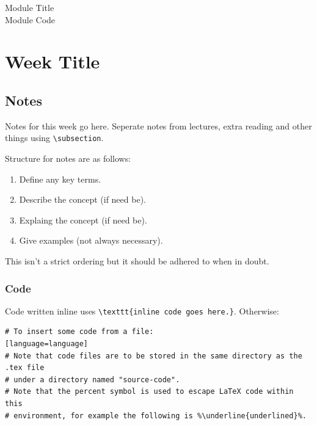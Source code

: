 \documentclass[a4paper,oneside]{report}
\begin{document}
\begin{titlepage}
	\raggedleft
	\vspace*{1cm}
	\Huge{Module Title}\\
	\vspace{0.5cm}
	\Large{Module Code}
\end{titlepage}

\null
\thispagestyle{empty}
\addtocounter{page}{-2}
\newpage

\tableofcontents

\chapter{Week Title}

\section{Notes}

Notes for this week go here. Seperate notes from lectures, extra reading and
other things using \texttt{\textbackslash subsection}.

Structure for notes are as follows:

\begin{enumerate}
	\item{Define any key terms.}
	\item{Describe the concept (if need be).}
	\item{Explaing the concept (if need be).}
	\item{Give examples (not always necessary).}
\end{enumerate}

This isn't a strict ordering but it should be adhered to when in doubt.

\subsection{Code}

Code written inline uses \texttt{\textbackslash texttt\{inline code goes
here.\}}. Otherwise:

\begin{lstlisting}
# To insert some code from a file:
[language=language]
# Note that code files are to be stored in the same directory as the .tex file
# under a directory named "source-code".
# Note that the percent symbol is used to escape LaTeX code within this
# environment, for example the following is %\underline{underlined}%.
\end{lstlisting}
\end{document}
